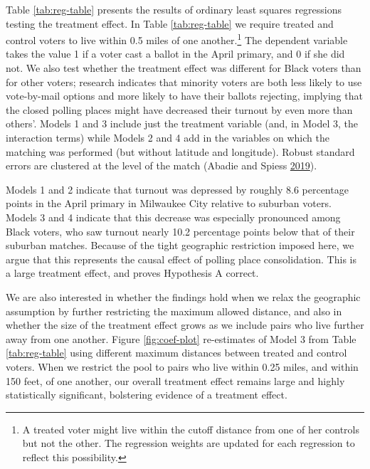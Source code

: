 \documentclass[
  12pt,
]{article}
\begin{document}
Table \ref{tab:reg-table} presents the results of ordinary least squares regressions testing the treatment effect. In Table \ref{tab:reg-table} we require treated and control voters to live within 0.5 miles of one another.\footnote{A treated voter might live within the cutoff distance from one of her controls but not the other. The regression weights are updated for each regression to reflect this possibility.} The dependent variable takes the value 1 if a voter cast a ballot in the April primary, and 0 if she did not. We also test whether the treatment effect was different for Black voters than for other voters; research indicates that minority voters are both less likely to use vote-by-mail options and more likely to have their ballots rejecting, implying that the closed polling places might have decreased their turnout by even more than others'. Models 1 and 3 include just the treatment variable (and, in Model 3, the interaction terms) while Models 2 and 4 add in the variables on which the matching was performed (but without latitude and longitude). Robust standard errors are clustered at the level of the match (Abadie and Spiess \protect\hyperlink{ref-Abadie2019}{2019}).

\begin{singlespace}


\end{singlespace}

Models 1 and 2 indicate that turnout was depressed by roughly 8.6 percentage points in the April primary in Milwaukee City relative to suburban voters. Models 3 and 4 indicate that this decrease was especially pronounced among Black voters, who saw turnout nearly 10.2 percentage points below that of their suburban matches. Because of the tight geographic restriction imposed here, we argue that this represents the causal effect of polling place consolidation. This is a large treatment effect, and proves Hypothesis A correct.

We are also interested in whether the findings hold when we relax the geographic assumption by further restricting the maximum allowed distance, and also in whether the size of the treatment effect grows as we include pairs who live further away from one another. Figure \ref{fig:coef-plot} re-estimates of Model 3 from Table \ref{tab:reg-table} using different maximum distances between treated and control voters. When we restrict the pool to pairs who live within 0.25 miles, and within 150 feet, of one another, our overall treatment effect remains large and highly statistically significant, bolstering evidence of a treatment effect.
\end{document}
